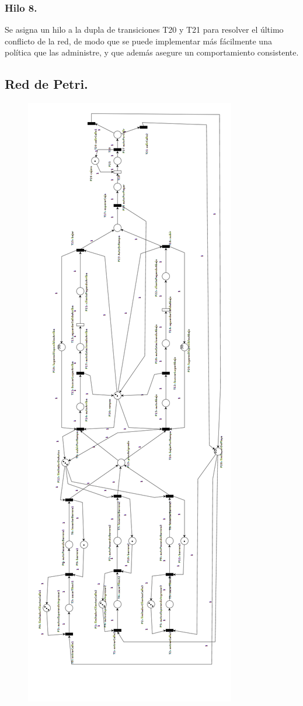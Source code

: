\documentclass[12pt,a4paper]{article}
\begin{document}
\subsubsection*{Hilo 8.}
Se asigna un hilo a la dupla de transiciones T20 y T21 para resolver el último conflicto de la red, de modo que se puede implementar más fácilmente una política que las administre, y que además asegure un comportamiento consistente. 

\subsection{Red de Petri.}
\begin{figure}[H]
    \centering
    \includegraphics[scale=0.34]{./estacionamiento_2019}
    \label{fig:rdp}
\end{figure}{}
\end{document}
